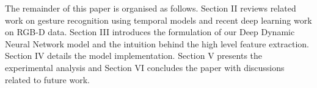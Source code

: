 The remainder of this paper is organised as follows. Section II reviews related work on gesture recognition using temporal models and recent deep learning work on RGB-D data. Section III introduces the formulation of our Deep Dynamic Neural Network model and the intuition behind the high level feature extraction. Section IV details the model implementation. Section V presents the experimental analysis and Section VI concludes the paper with discussions related to future work.


\endinput

